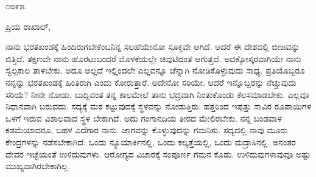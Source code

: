 \begin{flushright}
೧೮೯೫.
\end{flushright}

\noindent
ಪ್ರಿಯ ರಾಖಾಲ್,

ನಾನು ಭರತಖಂಡಕ್ಕೆ ಹಿಂದಿರುಗಬೇಕೆಂಬನಿನ್ನ ಸಲಹೆಯೇನೋ ಸೂಕ್ತವೇ ಆಗಿದೆ. ಆದರೆ ಈ ದೇಶದಲ್ಲಿ ಬೀಜವನ್ನು ಬಿತ್ತಿದೆ. ತಕ್ಷಣವೇ ನಾನು ಹೊರಟುಬಂದರೆ ಮೊಳಕೆಯಲ್ಲೇ ಚಿವುಟಿದಂತೆ ಆಗುತ್ತದೆ. ಅದಕ್ಕೋಸ್ಕರವಾಗಿಯೇ ನಾನು ಸ್ವಲ್ಪಕಾಲ ತಾಳಬೇಕು. ಅದೂ ಅಲ್ಲದೆ ಇಲ್ಲಿಂದಲೇ ಎಲ್ಲವನ್ನೂ ಚೆನ್ನಾಗಿ ನೋಡಿಕೊಳ್ಳುವುದು ಸಾಧ್ಯ. ಪ್ರತಿಯೊಬ್ಬರೂ ನನ್ನನ್ನು ಭರತಖಂಡಕ್ಕೆ ಹಿಂತಿರುಗಿ ಎಂದು ಕೋರುತ್ತಾರೆ. ಅದೇನೋ ಸರಿಯೇ. ಆದರೆ ಇನ್ನೊಬ್ಬರನ್ನು ನೆಚ್ಚುವುದು ಸರಿಯೆ? ನೀನೇ ನೋಡು. ಬುದ್ದಿವಂತ ತನ್ನ ಕಾಲಮೇಲೆ ತಾನು ಭದ್ರವಾಗಿ ನಿಂತುಕೊಂಡು ಕೆಲಸಮಾಡಬೇಕು. ಎಲ್ಲವೂ ನಿಧಾನವಾಗಿ ಬರುವದು. ಸದ್ಯಕ್ಕೆ ಮಠ ಕಟ್ಟುವುದಕ್ಕೆ ಸ್ಥಳವನ್ನು ನೋಡುತ್ತಿರು. ಹತ್ತರಿಂದ ಇಪ್ಪತ್ತು ಸಾವಿರ ರೂಪಾಯಿಗಳ ಒಳಗೆ ಇರುವ ವಿಶಾಲವಾದ ಸ್ಥಳ ಬೇಕಾಗಿದೆ. ಅದು ಗಂಗಾನದಿಯ ತೀರದ ಮೇಲಿರಬೇಕು. ನನ್ನ ಬಂಡವಾಳ ಕಡಮೆಯಾದರೂ, ಬಹಳ ಎದೆಗಾರ ನಾನು. ಜಾಗವನ್ನು ಕೊಳ್ಳುವುದನ್ನು ಗಮನಿಸು. ಸದ್ಯದಲ್ಲಿ ನಾವು ಮೂರು ಕೇಂದ್ರಗಳನ್ನು ನಡೆಸಬೇಕಾಗಿದೆ: ಒಂದು ನ್ಯೂಯಾರ್ಕಿನಲ್ಲಿ, ಒಂದು ಕಲ್ಕತ್ತೆಯಲ್ಲಿ, ಒಂದು ಮದ್ರಾಸಿನಲ್ಲಿ. ಅನಂತರ ದೇವರ ಇಚ್ಛೆಯಂತೆ ಉಳಿದುವುಗಳು. ಆರೋಗ್ಯದ ವಿಚಾರಕ್ಕೆ ಸಂಪೂರ್ಣ ಗಮನ ಕೊಡು. ಉಳಿದುವುಗಳಾವುವೂ ಅಷ್ಟು ಮುಖ್ಯವಾಗಿರಬೇಕಾಗಿಲ್ಲ.

